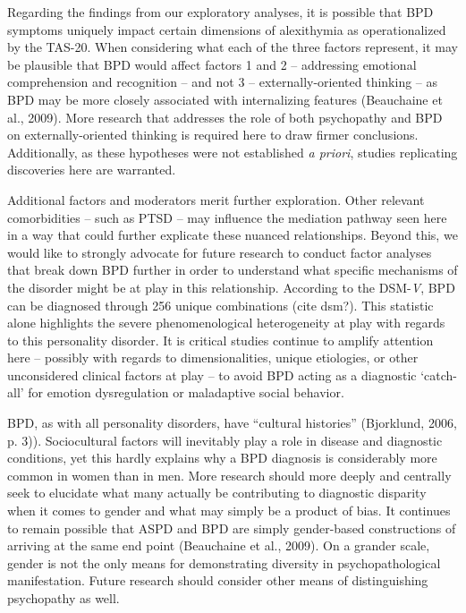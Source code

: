 \documentclass[
  man,floatsintext]{apa7}
\begin{document}
Regarding the findings from our exploratory analyses, it is possible that BPD symptoms uniquely impact certain dimensions of alexithymia as operationalized by the TAS-20. When considering what each of the three factors represent, it may be plausible that BPD would affect factors 1 and 2 -- addressing emotional comprehension and recognition -- and not 3 -- externally-oriented thinking -- as BPD may be more closely associated with internalizing features (Beauchaine et al., 2009). More research that addresses the role of both psychopathy and BPD on externally-oriented thinking is required here to draw firmer conclusions. Additionally, as these hypotheses were not established \emph{a priori}, studies replicating discoveries here are warranted.

Additional factors and moderators merit further exploration. Other relevant comorbidities -- such as PTSD -- may influence the mediation pathway seen here in a way that could further explicate these nuanced relationships. Beyond this, we would like to strongly advocate for future research to conduct factor analyses that break down BPD further in order to understand what specific mechanisms of the disorder might be at play in this relationship. According to the DSM-\emph{V}, BPD can be diagnosed through 256 unique combinations (cite dsm?). This statistic alone highlights the severe phenomenological heterogeneity at play with regards to this personality disorder. It is critical studies continue to amplify attention here -- possibly with regards to dimensionalities, unique etiologies, or other unconsidered clinical factors at play -- to avoid BPD acting as a diagnostic `catch-all' for emotion dysregulation or maladaptive social behavior.

BPD, as with all personality disorders, have ``cultural histories'' (Bjorklund, 2006, p. 3)). Sociocultural factors will inevitably play a role in disease and diagnostic conditions, yet this hardly explains why a BPD diagnosis is considerably more common in women than in men. More research should more deeply and centrally seek to elucidate what many actually be contributing to diagnostic disparity when it comes to gender and what may simply be a product of bias. It continues to remain possible that ASPD and BPD are simply gender-based constructions of arriving at the same end point (Beauchaine et al., 2009). On a grander scale, gender is not the only means for demonstrating diversity in psychopathological manifestation. Future research should consider other means of distinguishing psychopathy as well.
\end{document}
